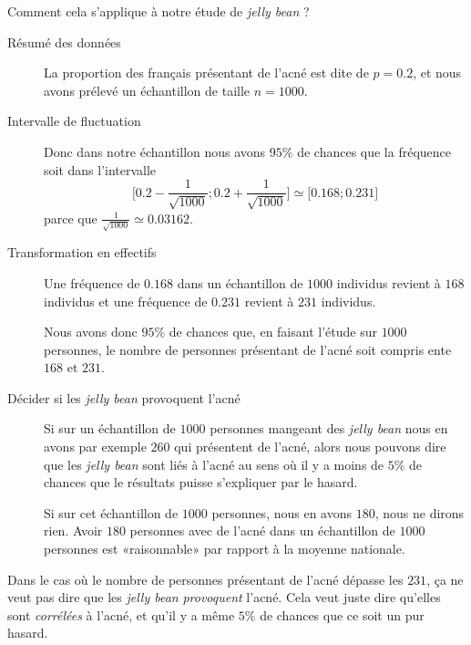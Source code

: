 Comment cela s'applique à notre étude de \emph{jelly bean} ? 
\begin{description}
    \item[Résumé des données]
        La proportion des français présentant de l'acné est dite de \( p=0.2\), et nous avons prélevé un échantillon de taille \( n=1000\). 
    \item[Intervalle de fluctuation] 
        Donc dans notre échantillon nous avons \( 95\%\) de chances que la fréquence soit dans l'intervalle
        \begin{equation}
            \mathopen[ 0.2-\frac{1}{ \sqrt{1000} } ; 0.2+\frac{1}{ \sqrt{1000} } \mathclose]\simeq\mathopen[ 0.168 ; 0.231 \mathclose]
        \end{equation}
        parce que \( \frac{1}{ \sqrt{1000} }\simeq 0.03162\).
    \item[Transformation en effectifs]

        Une fréquence de \( 0.168\) dans un échantillon de \( 1000\) individus revient à \( 168\) individus et une fréquence de \( 0.231\) revient à \( 231\) individus.

        Nous avons donc \( 95\%\) de chances que, en faisant l'étude sur \( 1000\) personnes, le nombre de personnes présentant de l'acné soit compris ente \( 168\) et \( 231\).
    \item[Décider si les \emph{jelly bean} provoquent l'acné]
        Si sur un échantillon de \( 1000\) personnes mangeant des \emph{jelly bean} nous en avons par exemple \( 260\) qui présentent de l'acné, alors nous pouvons dire que les \emph{jelly bean} sont liés à l'acné au sens où il y a moins de \( 5\%\) de chances que le résultats puisse s'expliquer par le hasard.

        Si sur cet échantillon de \( 1000\) personnes, nous en avons \( 180\), nous ne dirons rien. Avoir \( 180\) personnes avec de l'acné dans un échantillon de \( 1000\) personnes est «raisonnable» par rapport à la moyenne nationale.
\end{description}

\begin{remark}
    Dans le cas où le nombre de personnes présentant de l'acné dépasse les \( 231\), ça ne veut pas dire que les \emph{jelly bean} \emph{provoquent} l'acné. Cela veut juste dire qu'elles sont \emph{corrélées} à l'acné, et qu'il y a même \( 5\%\) de chances que ce soit un pur hasard.
\end{remark}

